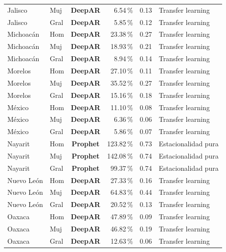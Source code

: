 \documentclass[12pt, letterpaper]{article}
\begin{document}
\begin{longtable}{l l >{\bfseries}c r r l}
Jalisco & Muj & \textcolor{cdeepar}{\textbf{DeepAR}} & 6.54\,\% & 0.13 & Transfer learning \\
Jalisco & Gral & \textcolor{cdeepar}{\textbf{DeepAR}} & 5.85\,\% & 0.12 & Transfer learning \\
Michoacán & Hom & \textcolor{cdeepar}{\textbf{DeepAR}} & 23.38\,\% & 0.27 & Transfer learning \\
Michoacán & Muj & \textcolor{cdeepar}{\textbf{DeepAR}} & 18.93\,\% & 0.21 & Transfer learning \\
Michoacán & Gral & \textcolor{cdeepar}{\textbf{DeepAR}} & 8.94\,\% & 0.14 & Transfer learning \\
Morelos & Hom & \textcolor{cdeepar}{\textbf{DeepAR}} & 27.10\,\% & 0.11 & Transfer learning \\
Morelos & Muj & \textcolor{cdeepar}{\textbf{DeepAR}} & 35.52\,\% & 0.27 & Transfer learning \\
Morelos & Gral & \textcolor{cdeepar}{\textbf{DeepAR}} & 15.16\,\% & 0.18 & Transfer learning \\
México & Hom & \textcolor{cdeepar}{\textbf{DeepAR}} & 11.10\,\% & 0.08 & Transfer learning \\
México & Muj & \textcolor{cdeepar}{\textbf{DeepAR}} & 6.36\,\% & 0.06 & Transfer learning \\
México & Gral & \textcolor{cdeepar}{\textbf{DeepAR}} & 5.86\,\% & 0.07 & Transfer learning \\
Nayarit & Hom & \textcolor{cprophet}{\textbf{Prophet}} & 123.82\,\% & 0.73 & Estacionalidad pura \\
Nayarit & Muj & \textcolor{cprophet}{\textbf{Prophet}} & 142.08\,\% & 0.74 & Estacionalidad pura \\
Nayarit & Gral & \textcolor{cprophet}{\textbf{Prophet}} & 99.37\,\% & 0.74 & Estacionalidad pura \\
Nuevo León & Hom & \textcolor{cdeepar}{\textbf{DeepAR}} & 27.33\,\% & 0.16 & Transfer learning \\
Nuevo León & Muj & \textcolor{cdeepar}{\textbf{DeepAR}} & 64.83\,\% & 0.44 & Transfer learning \\
Nuevo León & Gral & \textcolor{cdeepar}{\textbf{DeepAR}} & 20.52\,\% & 0.13 & Transfer learning \\
Oaxaca & Hom & \textcolor{cdeepar}{\textbf{DeepAR}} & 47.89\,\% & 0.09 & Transfer learning \\
Oaxaca & Muj & \textcolor{cdeepar}{\textbf{DeepAR}} & 46.82\,\% & 0.19 & Transfer learning \\
Oaxaca & Gral & \textcolor{cdeepar}{\textbf{DeepAR}} & 12.63\,\% & 0.06 & Transfer learning \\

\end{longtable}
\end{document}
